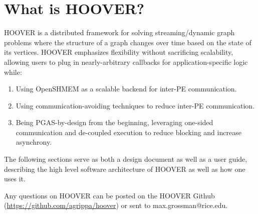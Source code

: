 \section{What is HOOVER?}

HOOVER is a distributed framework for solving streaming/dynamic graph problems
where the structure of a graph changes over time based on the state of its
vertices. HOOVER emphasizes flexibility without sacrificing scalability,
allowing users to plug in nearly-arbitrary callbacks for application-specific
logic while:

\begin{enumerate}
\item Using OpenSHMEM as a scalable backend for inter-PE communication.
\item Using communication-avoiding techniques to reduce inter-PE communication.
\item Being PGAS-by-design from the beginning, leveraging one-sided
communication and de-coupled execution to reduce blocking and increase
asynchrony.
\end{enumerate}

The following sections serve as both a design document as well as a user guide,
describing the high level software architecture of HOOVER as well as how one
uses it.

Any questions on HOOVER can be posted on the HOOVER Github
(\url{https://github.com/agrippa/hoover}) or sent to max.grossman@rice.edu.
